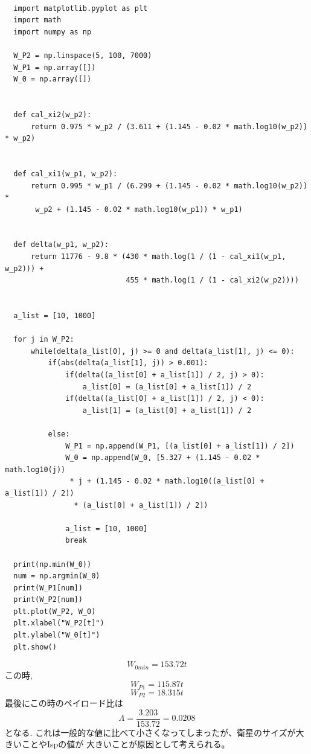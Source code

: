 \begin{lstlisting}[basicstyle=\ttfamily\footnotesize, frame=single]

  import matplotlib.pyplot as plt
  import math
  import numpy as np

  W_P2 = np.linspace(5, 100, 7000)
  W_P1 = np.array([])
  W_0 = np.array([])


  def cal_xi2(w_p2):
      return 0.975 * w_p2 / (3.611 + (1.145 - 0.02 * math.log10(w_p2)) * w_p2)


  def cal_xi1(w_p1, w_p2):
      return 0.995 * w_p1 / (6.299 + (1.145 - 0.02 * math.log10(w_p2)) *
       w_p2 + (1.145 - 0.02 * math.log10(w_p1)) * w_p1)


  def delta(w_p1, w_p2):
      return 11776 - 9.8 * (430 * math.log(1 / (1 - cal_xi1(w_p1, w_p2))) +
                            455 * math.log(1 / (1 - cal_xi2(w_p2))))


  a_list = [10, 1000]

  for j in W_P2:
      while(delta(a_list[0], j) >= 0 and delta(a_list[1], j) <= 0):
          if(abs(delta(a_list[1], j)) > 0.001):
              if(delta((a_list[0] + a_list[1]) / 2, j) > 0):
                  a_list[0] = (a_list[0] + a_list[1]) / 2
              if(delta((a_list[0] + a_list[1]) / 2, j) < 0):
                  a_list[1] = (a_list[0] + a_list[1]) / 2

          else:
              W_P1 = np.append(W_P1, [(a_list[0] + a_list[1]) / 2])
              W_0 = np.append(W_0, [5.327 + (1.145 - 0.02 * math.log10(j))
               * j + (1.145 - 0.02 * math.log10((a_list[0] + a_list[1]) / 2))
                * (a_list[0] + a_list[1]) / 2])

              a_list = [10, 1000]
              break

  print(np.min(W_0))
  num = np.argmin(W_0)
  print(W_P1[num])
  print(W_P2[num])
  plt.plot(W_P2, W_0)
  plt.xlabel("W_P2[t]")
  plt.ylabel("W_0[t]")
  plt.show()
\end{lstlisting}

\begin{equation}
  W_{0min} = 153.72t
\end{equation}
この時,
\begin{equation}
  W_{P1} = 115.87t
\end{equation}
\begin{equation}
  W_{P2} = 18.315t
\end{equation}
最後にこの時のペイロード比は
\begin{equation}
  \Lambda =\frac{3.203}{153.72} = 0.0208
\end{equation}
となる.
これは一般的な値に比べて小さくなってしまったが、衛星のサイズが大きいことやIspの値が
大きいことが原因として考えられる。
